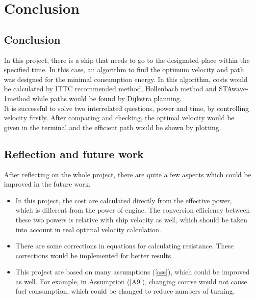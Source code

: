 \chapter{Conclusion}
\section{Conclusion}
In this project, there is a ship that needs to go to the designated place within the specified time. In this case, an algorithm to find the optimum velocity and path was designed for the minimal consumption energy. In this algorithm, costs would be calculated by ITTC recommended method, Hollenbach method and STAwave-1method while paths would be found by Dijkstra planning.
\\It is successful to solve two interrelated questions, power and time, by controlling velocity firstly. After comparing and checking, the optimal velocity would be given in the terminal and the efficient path would be shown by plotting.
\section{Reflection and future work}
After reflecting on the whole project, there are quite a few aspects which could be improved in the future work.
\begin{itemize}
    \item In this project, the cost are calculated directly from the effective power, which is different from the power of engine. The conversion efficiency between these two powers is relative with ship velocity as well, which should be taken into account in real optimal velocity calculation.
    \item There are some corrections in equations for calculating resistance. These corrections would be implemented for better results.
    \item This project are based on many assumptions (\autoref{ass}), which could be improved as well. For example, in Assumption (\ref{A9}), changing course would not cause fuel consumption, which could be changed to reduce numbers of turning.
\end{itemize}